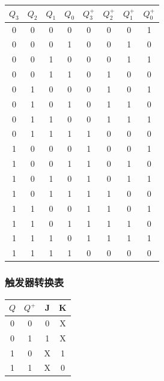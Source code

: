 \documentclass{article}
\begin{document}
\begin{table}[!hbp]
\centering
\begin{tabular}{|c|c|c|c||c|c|c|c|}
\hline
$Q_3$ & $Q_2$ & $Q_1$ & $Q_0$ & $Q_3^+$ & $Q_2^+$ & $Q_1^+$ & $Q_0^+$ \\
\hline
\hline
0 & 0 & 0 & 0 & 0 & 0 & 0 & 1 \\
\hline
0 & 0 & 0 & 1 & 0 & 0 & 1 & 0 \\
\hline
0 & 0 & 1 & 0 & 0 & 0 & 1 & 1 \\
\hline
0 & 0 & 1 & 1 & 0 & 1 & 0 & 0 \\
\hline
0 & 1 & 0 & 0 & 0 & 1 & 0 & 1 \\
\hline
0 & 1 & 0 & 1 & 0 & 1 & 1 & 0 \\
\hline
0 & 1 & 1 & 0 & 0 & 1 & 1 & 1 \\
\hline
0 & 1 & 1 & 1 & 1 & 0 & 0 & 0 \\
\hline
1 & 0 & 0 & 0 & 1 & 0 & 0 & 1 \\
\hline
1 & 0 & 0 & 1 & 1 & 0 & 1 & 0 \\
\hline
1 & 0 & 1 & 0 & 1 & 0 & 1 & 1 \\
\hline
1 & 0 & 1 & 1 & 1 & 1 & 0 & 0 \\
\hline
1 & 1 & 0 & 0 & 1 & 1 & 0 & 1 \\
\hline
1 & 1 & 0 & 1 & 1 & 1 & 1 & 0 \\
\hline
1 & 1 & 1 & 0 & 1 & 1 & 1 & 1 \\
\hline
1 & 1 & 1 & 1 & 0 & 0 & 0 & 0 \\
\hline
\end{tabular}
\end{table}

\subsubsection{触发器转换表}

\begin{table}[!hbp]
\centering
\begin{tabular}{|c|c||c|c|}
\hline
$Q$ & $Q^+$ & J & K \\
\hline
\hline
0 & 0 & 0 & X \\
\hline
0 & 1 & 1 & X \\
\hline
1 & 0 & X & 1 \\
\hline
1 & 1 & X & 0 \\
\hline
\end{tabular}
\end{table}

\newpage
\end{document}
